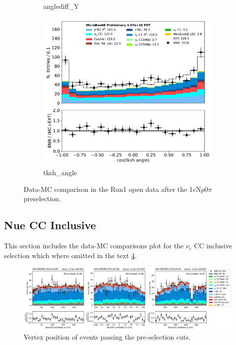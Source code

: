 \documentclass[a4paper]{article}
\newcommand{\npsel}{1$e$N$p$0$\pi$ }
\begin{document}
\begin{figure}[H]
\begin{center}
\begin{subfigure}[b]{0.3\textwidth}
    \caption{\label{fig:1eNp:dataMCRun1:anglediff_Y} anglediff\_Y }
    \end{subfigure}
    \begin{subfigure}[b]{0.3\textwidth}
    \centering
    \includegraphics[width=1.00\textwidth]{1eNp/dataMCRun1/tksh_angle01152020.pdf}
    \caption{\label{fig:1eNp:dataMCRun1:tksh_angle} tksh\_angle }
    \end{subfigure}
\caption{\label{fig:1eNp:dataMCRun1:pi02}Data-MC comparison in the Run1 open data after the \npsel preselection.}
\end{center}
\end{figure}
\clearpage
\newpage


\subsection{Nue CC Inclusive}
\label{sec:datamc:nueccinclusive}
This section includes the data-MC comparisons plot for the $\nu_e$ CC inclusive selection which where omitted in the text \ref{fig:pre_vtx}.
\begin{figure}[H]
    \centering
    \includegraphics[width=\textwidth]{NueCCsel/Images/run1/pre_vtx.pdf}
    \caption{Vertex position of events passing the pre-selection cuts.}
    \label{fig:pre_vtx}
\end{figure}
\clearpage
\newpage
\end{document}
